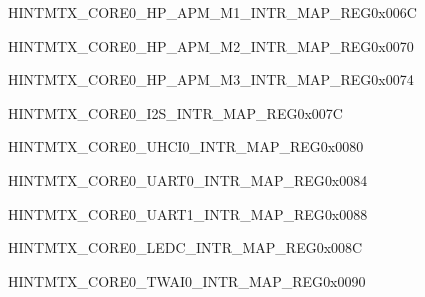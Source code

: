 \begin{register}{H}{INTMTX\_CORE0\_HP\_APM\_M1\_INTR\_MAP\_REG}{0x006C}\label{regdesc:INTMTXCORE0HPAPMM1INTRMAPREG}
\end{register}\vspace{-3em}


\begin{register}{H}{INTMTX\_CORE0\_HP\_APM\_M2\_INTR\_MAP\_REG}{0x0070}\label{regdesc:INTMTXCORE0HPAPMM2INTRMAPREG}
\end{register}\vspace{-3em}


\begin{register}{H}{INTMTX\_CORE0\_HP\_APM\_M3\_INTR\_MAP\_REG}{0x0074}\label{regdesc:INTMTXCORE0HPAPMM3INTRMAPREG}
\end{register}\vspace{-3em}




\begin{register}{H}{INTMTX\_CORE0\_I2S\_INTR\_MAP\_REG}{0x007C}\label{regdesc:INTMTXCORE0I2SINTRMAPREG}
\end{register}\vspace{-3em}


\begin{register}{H}{INTMTX\_CORE0\_UHCI0\_INTR\_MAP\_REG}{0x0080}\label{regdesc:INTMTXCORE0UHCI0INTRMAPREG}
\end{register}\vspace{-3em}


\begin{register}{H}{INTMTX\_CORE0\_UART0\_INTR\_MAP\_REG}{0x0084}\label{regdesc:INTMTXCORE0UART0INTRMAPREG}
\end{register}\vspace{-3em}


\begin{register}{H}{INTMTX\_CORE0\_UART1\_INTR\_MAP\_REG}{0x0088}\label{regdesc:INTMTXCORE0UART1INTRMAPREG}
\end{register}\vspace{-3em}


\begin{register}{H}{INTMTX\_CORE0\_LEDC\_INTR\_MAP\_REG}{0x008C}\label{regdesc:INTMTXCORE0LEDCINTRMAPREG}
\end{register}\vspace{-3em}

\begin{register}{H}{INTMTX\_CORE0\_TWAI0\_INTR\_MAP\_REG}{0x0090}\label{regdesc:INTMTXCORE0TWAI0INTRMAPREG}
\end{register}\vspace{-3em}


